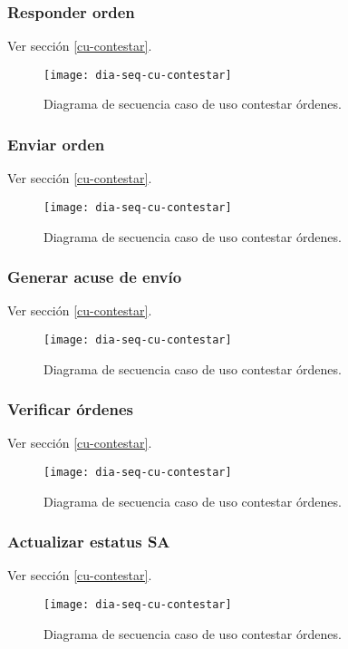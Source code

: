 \subsubsection{Responder orden}
Ver sección \ref{cu-contestar}.\\
\begin{figure}[h]
	\centering
	\texttt{[image: dia-seq-cu-contestar]}
	\caption{Diagrama de secuencia caso de uso contestar órdenes.}
	\label{fig:dia-seq-cu-contestar}
\end{figure}
\subsubsection{Enviar orden}
Ver sección \ref{cu-contestar}.\\
\begin{figure}[h]
	\centering
	\texttt{[image: dia-seq-cu-contestar]}
	\caption{Diagrama de secuencia caso de uso contestar órdenes.}
	\label{fig:dia-seq-cu-contestar}
\end{figure}
\subsubsection{Generar acuse de envío}
Ver sección \ref{cu-contestar}.\\
\begin{figure}[h]
	\centering
	\texttt{[image: dia-seq-cu-contestar]}
	\caption{Diagrama de secuencia caso de uso contestar órdenes.}
	\label{fig:dia-seq-cu-contestar}
\end{figure}
\subsubsection{Verificar órdenes}
Ver sección \ref{cu-contestar}.\\
\begin{figure}[h]
	\centering
	\texttt{[image: dia-seq-cu-contestar]}
	\caption{Diagrama de secuencia caso de uso contestar órdenes.}
	\label{fig:dia-seq-cu-contestar}
\end{figure}
\subsubsection{Actualizar estatus SA}
Ver sección \ref{cu-contestar}.\\
\begin{figure}[h]
	\centering
	\texttt{[image: dia-seq-cu-contestar]}
	\caption{Diagrama de secuencia caso de uso contestar órdenes.}
	\label{fig:dia-seq-cu-contestar}
\end{figure}
